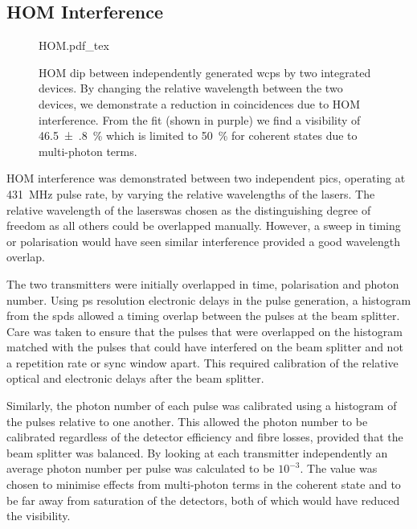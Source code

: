 

\subsection{HOM Interference}

\begin{figure}[tp]
	\centering
	\def\svgwidth{0.8\textwidth} 
	{HOM.pdf_tex}
	\caption[Hong-Ou-Mandel interference between integrated devices]{\ac{HOM} dip between independently generated \acp{wcp} by two integrated devices. By changing the relative wavelength between the two devices, we demonstrate a reduction in coincidences due to \ac{HOM} interference. From the fit (shown in purple) we find a visibility of \SI{46.5(8)}{\%} which is limited to \SI{50}{\percent} for coherent states due to multi-photon terms.}
	\label{fig:HOM}
\end{figure}

\acl{HOM} interference was demonstrated between two independent \acp{pic}, operating at \SI{431}{\MHz} pulse rate, by varying the relative wavelengths of the lasers. The relative wavelength of the laserswas chosen as the distinguishing degree of freedom as all others could be overlapped manually. However, a sweep in timing or polarisation would have seen similar interference provided a good wavelength overlap. 

The two transmitters were initially overlapped in time, polarisation and photon number. Using ps resolution electronic delays in the pulse generation, a histogram from the \acp{spd} allowed a timing overlap between the pulses at the beam splitter. Care was taken to ensure that the pulses that were overlapped on the histogram matched with the pulses that could have interfered on the beam splitter and not a repetition rate or sync window apart. This required calibration of the relative optical and electronic delays after the beam splitter. 

Similarly, the photon number of each pulse was calibrated using a histogram of the pulses relative to one another. This allowed the photon number to be calibrated regardless of the detector efficiency and fibre losses, provided that the beam splitter was balanced. By looking at each transmitter independently an average photon number per pulse was calculated to be $10^{-3}$. The value was chosen to minimise effects from multi-photon terms in the coherent state and to be far away from saturation of the detectors, both of which would have reduced the visibility.

